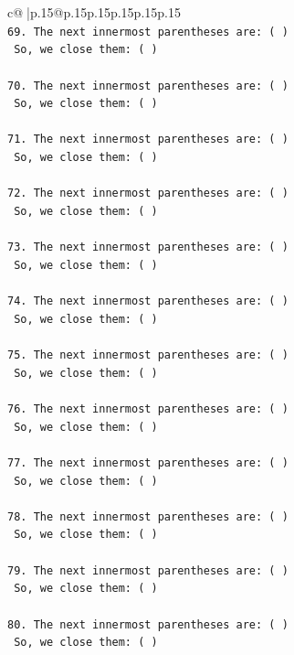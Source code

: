 \documentclass{article}
\begin{document}
{\begin{supertabular}{c@{$\;$}|p{.15\linewidth}@{}p{.15\linewidth}p{.15\linewidth}p{.15\linewidth}p{.15\linewidth}p{.15\linewidth}}
{{{\\ 
\texttt{69. The next innermost parentheses are: ( ) } \\
\texttt{    So, we close them: ( ) } \\
\\ 
\texttt{70. The next innermost parentheses are: ( ) } \\
\texttt{    So, we close them: ( ) } \\
\\ 
\texttt{71. The next innermost parentheses are: ( ) } \\
\texttt{    So, we close them: ( ) } \\
\\ 
\texttt{72. The next innermost parentheses are: ( ) } \\
\texttt{    So, we close them: ( ) } \\
\\ 
\texttt{73. The next innermost parentheses are: ( ) } \\
\texttt{    So, we close them: ( ) } \\
\\ 
\texttt{74. The next innermost parentheses are: ( ) } \\
\texttt{    So, we close them: ( ) } \\
\\ 
\texttt{75. The next innermost parentheses are: ( ) } \\
\texttt{    So, we close them: ( ) } \\
\\ 
\texttt{76. The next innermost parentheses are: ( ) } \\
\texttt{    So, we close them: ( ) } \\
\\ 
\texttt{77. The next innermost parentheses are: ( ) } \\
\texttt{    So, we close them: ( ) } \\
\\ 
\texttt{78. The next innermost parentheses are: ( ) } \\
\texttt{    So, we close them: ( ) } \\
\\ 
\texttt{79. The next innermost parentheses are: ( ) } \\
\texttt{    So, we close them: ( ) } \\
\\ 
\texttt{80. The next innermost parentheses are: ( ) } \\
\texttt{    So, we close them: ( ) } \\
}}}
\end{supertabular}}
\end{document}
